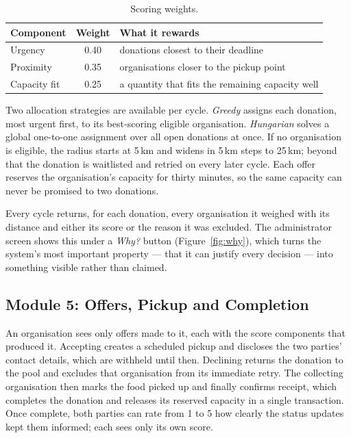 \documentclass[11pt,a4paper]{report}
\begin{document}
\begin{table}[H]
\centering
\small
\begin{tabular}{@{}lcl@{}}
\toprule
\textbf{Component} & \textbf{Weight} & \textbf{What it rewards} \\
\midrule
Urgency   & 0.40 & donations closest to their deadline \\
Proximity & 0.35 & organisations closer to the pickup point \\
Capacity fit & 0.25 & a quantity that fits the remaining capacity well \\
\bottomrule
\end{tabular}
\caption{Scoring weights.}
\end{table}

Two allocation strategies are available per cycle. \emph{Greedy} assigns each
donation, most urgent first, to its best-scoring eligible organisation.
\emph{Hungarian} solves a global one-to-one assignment over all open donations at
once. If no organisation is eligible, the radius starts at 5\,km and widens in
5\,km steps to 25\,km; beyond that the donation is waitlisted and retried on
every later cycle. Each offer reserves the organisation's capacity for thirty
minutes, so the same capacity can never be promised to two donations.

Every cycle returns, for each donation, every organisation it weighed with its
distance and either its score or the reason it was excluded. The administrator
screen shows this under a \emph{Why?} button (Figure~\ref{fig:why}), which
turns the system's most important property --- that it can justify every
decision --- into something visible rather than claimed.

\subsection{Module 5: Offers, Pickup and Completion}

An organisation sees only offers made to it, each with the score components
that produced it. Accepting creates a scheduled pickup and discloses the two
parties' contact details, which are withheld until then. Declining returns the
donation to the pool and excludes that organisation from its immediate retry.
The collecting organisation then marks the food picked up and finally confirms
receipt, which completes the donation and releases its reserved capacity in a
single transaction. Once complete, both parties can rate from 1 to 5 how clearly
the status updates kept them informed; each sees only its own score.
\end{document}

